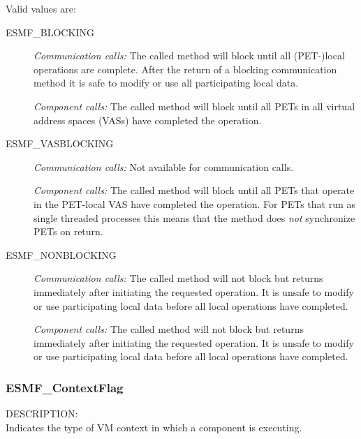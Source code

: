 Valid values are:
\begin{description}

\item [ESMF\_BLOCKING]
         {\em Communication calls:} The called method will block until all
         (PET-)local operations are complete. After the return of a blocking
         communication method it is safe to modify or use all participating
         local data.
         
         {\em Component calls:} The called method will block until all PETs in
         all virtual address spaces (VASs) have completed the operation.

\item [ESMF\_VASBLOCKING]
         {\em Communication calls:} Not available for communication calls.
         
         {\em Component calls:} The called method will block until all PETs that
         operate in the PET-local VAS have completed the operation. For PETs
         that run as single threaded processes this means that the method does
         {\em not} synchronize PETs on return.
         
\item [ESMF\_NONBLOCKING]
         {\em Communication calls:} The called method will not block but 
         returns immediately after initiating the requested operation. It is
         unsafe to modify or use participating local data before all local
         operations have completed.

         {\em Component calls:} The called method will not block but 
         returns immediately after initiating the requested operation. It is
         unsafe to modify or use participating local data before all local
         operations have completed.

\end{description}

\subsubsection{ESMF\_ContextFlag}
\label{opt:contextflag}
{\sf DESCRIPTION:\\}  
Indicates the type of VM context in which a component is executing.

